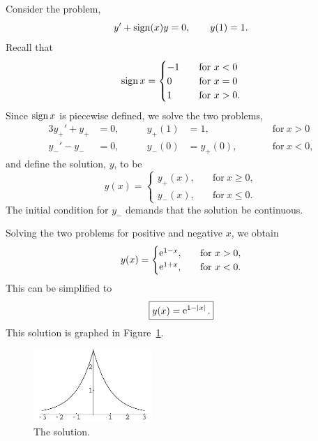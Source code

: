 \begin{Example}
  Consider the problem,
  \[ 
  y' + \mathop{\mathrm{sign}}\nolimits(x) y = 0, \qquad y(1) = 1.
  \]
  Recall that 
  \[ 
  \mathop{\mathrm{sign}}\nolimits x = 
  \begin{cases}
    -1 \quad &\mathrm{for}\ x < 0 \\
    0 \quad &\mathrm{for}\ x = 0 \\
    1 \quad &\mathrm{for}\ x > 0. 
  \end{cases}
  \]
  Since $\mathop{\mathrm{sign}}\nolimits x$ is piecewise defined, we solve the two problems,
  \begin{alignat*}{3}
    y_+' + y_+ &= 0, &\qquad y_+(1) &= 1, &\qquad &\mathrm{for}\ x > 0 \\
    y_-' - y_- &= 0, &\qquad y_-(0) &= y_+(0), &\qquad &\mathrm{for}\ x < 0,
  \end{alignat*}
  and define the solution, $y$, to be
  \[ y(x) = 
  \begin{cases}
    y_+(x), \quad &\mathrm{for}\ x \geq 0, \\
    y_-(x), \quad &\mathrm{for}\ x \leq 0.
  \end{cases} \]
  The initial condition for $y_-$ demands that the solution be continuous.

  Solving the two problems for positive and negative $x$, we obtain
  \[ 
  y(x) = 
  \begin{cases}
    \mathop{\mathrm{e}}\nolimits^{1-x},       \quad &\mathrm{for}\ x > 0, \\
    \mathop{\mathrm{e}}\nolimits^{1+x}, \quad &\mathrm{for}\ x < 0.
  \end{cases} 
  \]
  This can be simplified to
  \[ 
  \boxed{
    y(x) = \mathop{\mathrm{e}}\nolimits^{1 -|x|}.
    }
  \]
  This solution is graphed in Figure~\ref{figure epem}.

  \begin{figure}[tb!]
    \begin{center}
      \includegraphics[width=0.4\textwidth]{ode/first_order/epem}
    \end{center}
    \caption{The solution.} 
    \label{figure epem}
  \end{figure}

\end{Example}





